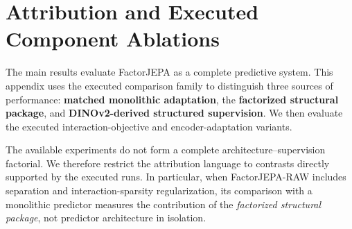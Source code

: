 \endgroup

\twocolumn














































\newcommand{\Score}{
\textcolor{AttrPending}{\textbf{[mean; 95\% CI]}}
}


\section{Attribution and Executed Component Ablations}
\label{app:attribution}

The main results evaluate FactorJEPA as a complete predictive system.
This appendix uses the executed comparison family to distinguish three
sources of performance: \textbf{matched monolithic adaptation}, the
\textbf{factorized structural package}, and
\textbf{DINOv2-derived structured supervision}. We then evaluate the
executed interaction-objective and encoder-adaptation variants.

The available experiments do not form a complete
architecture--supervision factorial. We therefore restrict the
attribution language to contrasts directly supported by the executed
runs. In particular, when FactorJEPA-RAW includes separation and
interaction-sparsity regularization, its comparison with a monolithic
predictor measures the contribution of the
\emph{factorized structural package}, not predictor architecture in
isolation.


